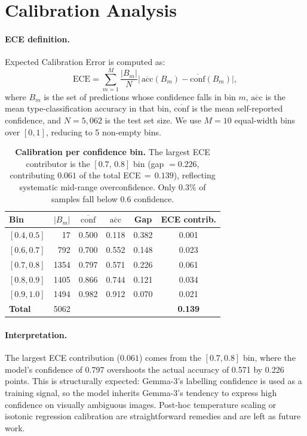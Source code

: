 \documentclass{article}
\begin{document}
\section{Calibration Analysis}
\label{app:calibration}

\paragraph{ECE definition.}
Expected Calibration Error is computed as:
\begin{equation}
  \mathrm{ECE} = \sum_{m=1}^{M} \frac{|B_m|}{N}
    \bigl|\,\overline{\mathrm{acc}}(B_m) -
    \overline{\mathrm{conf}}(B_m)\bigr|,
  \label{eq:ece}
\end{equation}
where $B_m$ is the set of predictions whose confidence falls in bin $m$,
$\overline{\mathrm{acc}}$ is the mean type-classification accuracy in
that bin, $\overline{\mathrm{conf}}$ is the mean self-reported
confidence, and $N{=}5{,}062$ is the test set size.
We use $M{=}10$ equal-width bins over $[0,1]$, reducing to 5 non-empty
bins.

\begin{table}[h]
\centering
\caption{\textbf{Calibration per confidence bin.}
  The largest ECE contributor is the $[0.7,\,0.8]$ bin (gap $=0.226$,
  contributing $0.061$ of the total ECE$\,{=}\,0.139$), reflecting
  systematic mid-range overconfidence.
  Only $0.3\%$ of samples fall below $0.6$ confidence.}
\label{tab:calib}
\small
\begin{tabular}{@{}lrcccc@{}}
\toprule
\textbf{Bin} & \textbf{$|B_m|$} & \textbf{$\overline{\mathrm{conf}}$}
  & \textbf{$\overline{\mathrm{acc}}$} & \textbf{Gap}
  & \textbf{ECE contrib.} \\
\midrule
$[0.4, 0.5]$ & 17    & 0.500 & 0.118 & 0.382 & 0.001 \\
$[0.6, 0.7]$ & 792   & 0.700 & 0.552 & 0.148 & 0.023 \\
$[0.7, 0.8]$ & 1354  & 0.797 & 0.571 & 0.226 & 0.061 \\
$[0.8, 0.9]$ & 1405  & 0.866 & 0.744 & 0.121 & 0.034 \\
$[0.9, 1.0]$ & 1494  & 0.982 & 0.912 & 0.070 & 0.021 \\
\midrule
\textbf{Total} & 5062 & & & & \textbf{0.139} \\
\bottomrule
\end{tabular}
\end{table}

\paragraph{Interpretation.}
The largest ECE contribution ($0.061$) comes from the $[0.7, 0.8]$ bin,
where the model's confidence of 0.797 overshoots the actual accuracy of
0.571 by 0.226 points.
This is structurally expected: Gemma-3's labelling confidence is used
as a training signal, so the model inherits Gemma-3's tendency to
express high confidence on visually ambiguous images.
Post-hoc temperature scaling or isotonic regression calibration are
straightforward remedies and are left as future work.
\end{document}
